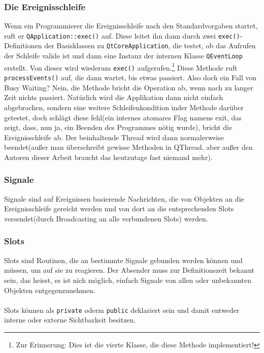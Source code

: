 \subsubsection{Die Ereignisschleife} \label{sec:evloop}
	Wenn ein Programmierer die Ereignisschleife nach den Standardvorgaben startet, ruft er \texttt{QApplication::exec()} auf. Diese leitet ihn dann
	durch zwei \texttt{exec()}-Definitionen der Basisklassen zu \texttt{QtCoreApplication}, die  testet, ob das Aufrufen der Schleife valide ist und dann eine
	 Instanz der internen Klasse \texttt{QEventLoop} erstellt. Von dieser wird wiederum \texttt{exec()} aufgerufen.\footnote{Zur Erinnerung: Dies ist die vierte
	Klasse, die diese Methode implementiert!} Diese Methode ruft \linebreak \texttt{processEvents()} auf, die dann wartet, bis etwas passiert. Also doch ein Fall von
	Busy Waiting? Nein, die Methode bricht die Operation ab, wenn nach zu langer Zeit nichts passiert. Natürlich wird die Applikation dann nicht einfach abgebrochen,
	sondern eine weitere Schleifenkondition inder Methode darüber getestet, doch schlägt diese fehl(ein internes atomares Flag namens exit, das zeigt, dass,
	nun ja, ein Beenden des Programmes nötig wurde), bricht die Ereignisschleife ab. Der beinhaltende Thread  wird dann normalerweise beendet(außer man
	überschreibt gewisse Methoden in QThread, aber außer den Autoren dieser Arbeit braucht das heutzutage fast niemand mehr).
\subsubsection{Signale}
	Signale sind auf Ereignissen basierende Nachrichten, die von Objekten an die Ereignisschleife gereicht werden und von dort an die entsprechenden Slots
	versendet(durch Broadcasting an alle verbundenen Slots) werden.
\subsubsection{Slots}
	Slots sind Routinen, die an bestimmte Signale gebunden werden können und müssen, um auf sie zu reagieren. Der Absender muss zur 
	Definitionszeit bekannt sein, das heisst, es ist nich möglich, einfach Signale von allen oder unbekannten Objekten entgegenzunehmen.
\paragraph{}
	Slots können als \texttt{private} oderm \texttt{public} deklariert sein und damit entweder interne oder externe Sichtbarkeit besitzen.
